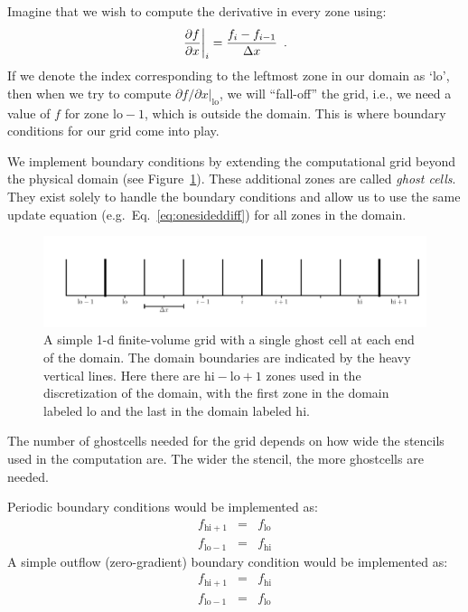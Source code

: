 Imagine that we wish to compute the derivative in every zone using:
\begin{equation}
\left . \frac{\partial f}{\partial x} \right |_i = \frac{f_i - f_{i-1}}{\Delta x} \enskip .
\label{eq:onesideddiff}
\end{equation}
If we denote the index corresponding to the leftmost zone in our
domain as `lo', then when we try to compute ${\partial f}/{\partial x}
|_\mathrm{lo}$, we will ``fall-off'' the grid, i.e., we need a value
of $f$ for zone $\mathrm{lo}-1$, which is outside the domain.  This is
where boundary conditions for our grid come into play.

We implement boundary conditions by extending the computational grid
beyond the physical domain (see Figure~\ref{fig:fv_gc}).  These
additional zones are called {\em ghost cells}.  They exist solely to
handle the boundary conditions and allow us to use the same update
equation (e.g.\ Eq.~\ref{eq:onesideddiff}) for all zones in the
domain.

\begin{figure}[t]
\centering
\includegraphics[width=\linewidth]{simplegrid_gc}
\caption[A simple 1-d finite-volume grid with ghost cells]
        {\label{fig:fv_gc} A simple 1-d finite-volume grid with a
          single ghost cell at each end of the domain.  The domain
          boundaries are indicated by the heavy vertical lines.  Here
          there are $\mathrm{hi}-\mathrm{lo}+1$ zones used in the
          discretization of the domain, with the first zone in the
          domain labeled $\mathrm{lo}$ and the last in the domain
          labeled $\mathrm{hi}$.}
\end{figure}

The number of ghostcells needed for the grid depends on how wide the
stencils used in the computation are.  The wider the stencil, the more
ghostcells are needed.

Periodic boundary conditions would be implemented as:
\begin{eqnarray}
f_{\mathrm{hi}+1} &=& f_\mathrm{lo} \\
f_{\mathrm{lo}-1} &=& f_\mathrm{hi}
\end{eqnarray}
A simple outflow (zero-gradient) boundary condition would be implemented as:
\begin{eqnarray}
f_{\mathrm{hi}+1} &=& f_\mathrm{hi} \\
f_{\mathrm{lo}-1} &=& f_\mathrm{lo}
\end{eqnarray}



